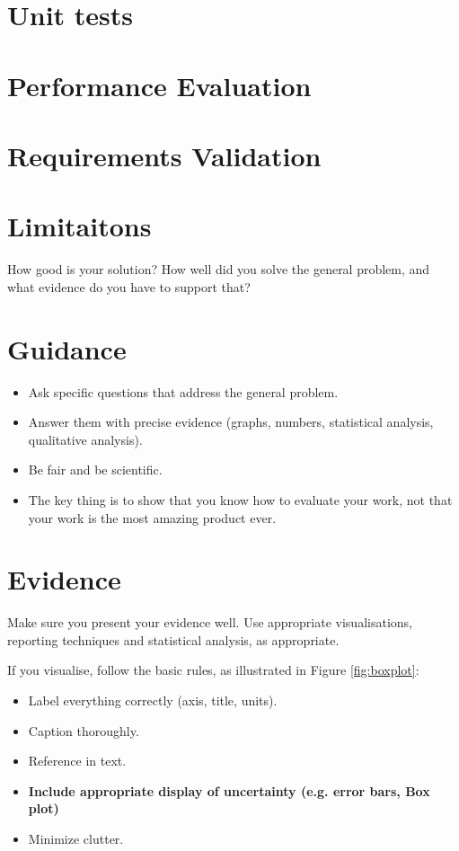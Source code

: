 \documentclass{l4proj}
\begin{document}
\section{Unit tests}

\section{Performance Evaluation}

\section{Requirements Validation}

\section{Limitaitons}

How good is your solution? How well did you solve the general problem, and what evidence do you have to support that?

\section{Guidance}
\begin{itemize}
    \item
        Ask specific questions that address the general problem.
    \item
        Answer them with precise evidence (graphs, numbers, statistical
        analysis, qualitative analysis).
    \item
        Be fair and be scientific.
    \item
        The key thing is to show that you know how to evaluate your work, not
        that your work is the most amazing product ever.
\end{itemize}

\section{Evidence}
Make sure you present your evidence well. Use appropriate visualisations, reporting techniques and statistical analysis, as appropriate.

If you visualise, follow the basic rules, as illustrated in Figure \ref{fig:boxplot}:
\begin{itemize}
\item Label everything correctly (axis, title, units).
\item Caption thoroughly.
\item Reference in text.
\item \textbf{Include appropriate display of uncertainty (e.g. error bars, Box plot)}
\item Minimize clutter.
\end{itemize}
\end{document}
